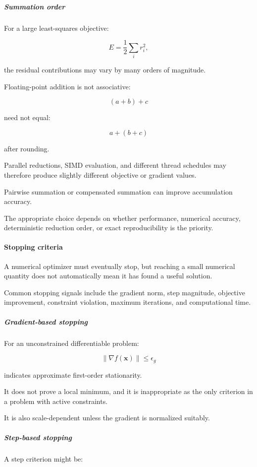 \subparagraph{Summation order}\label{summation-order}

For a large least-squares objective:

\[
E=\frac12\sum_i r_i^2,
\]

the residual contributions may vary by many orders of magnitude.

Floating-point addition is not associative:

\[
(a+b)+c
\]

need not equal:

\[
a+(b+c)
\]

after rounding.

Parallel reductions, SIMD evaluation, and different thread schedules may therefore produce slightly different objective or gradient values.

Pairwise summation or compensated summation can improve accumulation accuracy.

The appropriate choice depends on whether performance, numerical accuracy, deterministic reduction order, or exact reproducibility is the priority.

\paragraph{Stopping criteria}\label{stopping-criteria}

A numerical optimizer must eventually stop, but reaching a small numerical quantity does not automatically mean it has found a useful solution.

Common stopping signals include the gradient norm, step magnitude, objective improvement, constraint violation, maximum iterations, and computational time.

\subparagraph{Gradient-based stopping}\label{gradient-based-stopping}

For an unconstrained differentiable problem:

\[
\boxed{ \|\nabla f(\mathbf x)\|\le\epsilon_g }
\]

indicates approximate first-order stationarity.

It does not prove a local minimum, and it is inappropriate as the only criterion in a problem with active constraints.

It is also scale-dependent unless the gradient is normalized suitably.

\subparagraph{Step-based stopping}\label{step-based-stopping}

A step criterion might be:

